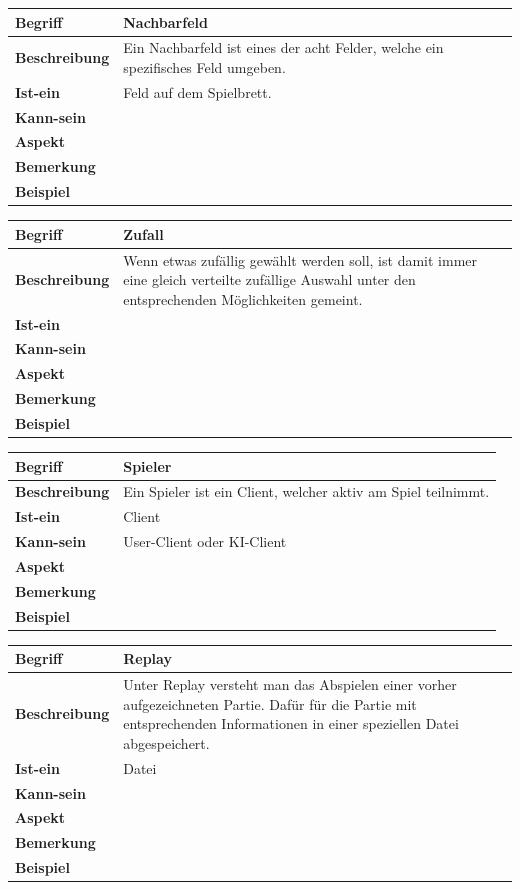 \documentclass[12pt]{article}
\newcounter{fa}
\begin{document}
\begin{tabularx}{\linewidth}{|l|X|}
\hline
\textbf{Begriff} & \textbf{Nachbarfeld } \\
\hline
\textbf{Beschreibung} & Ein Nachbarfeld ist eines der acht Felder, welche ein spezifisches Feld umgeben. \\
\hline
\textbf{Ist-ein} & Feld auf dem Spielbrett. \\
\hline
\textbf{Kann-sein} & \\
\hline
\textbf{Aspekt} &  \\
\hline
\textbf{Bemerkung} & \\
\hline
\textbf{Beispiel} & \\
\hline
\end{tabularx}

\begin{tabularx}{\linewidth}{|l|X|}
\hline
\textbf{Begriff} & \textbf{Zufall  } \\
\hline
\textbf{Beschreibung} & Wenn etwas zufällig gewählt werden soll, ist damit immer eine gleich verteilte zufällige Auswahl unter den
entsprechenden Möglichkeiten gemeint. \\
\hline
\textbf{Ist-ein} & \\
\hline
\textbf{Kann-sein} & \\
\hline
\textbf{Aspekt} &  \\
\hline
\textbf{Bemerkung} & \\
\hline
\textbf{Beispiel} & \\
\hline
\end{tabularx}

\begin{tabularx}{\linewidth}{|l|X|}
\hline
\textbf{Begriff} & \textbf{Spieler} \\
\hline
\textbf{Beschreibung} & Ein Spieler ist ein Client, welcher aktiv am Spiel teilnimmt.  \\
\hline
\textbf{Ist-ein} & Client\\
\hline
\textbf{Kann-sein} & User-Client oder KI-Client\\
\hline
\textbf{Aspekt} &  \\
\hline
\textbf{Bemerkung} & \\
\hline
\textbf{Beispiel} & \\
\hline
\end{tabularx}

\begin{tabularx}{\linewidth}{|l|X|}
\hline
\textbf{Begriff} & \textbf{Replay} \\
\hline
\textbf{Beschreibung} & Unter Replay versteht man das Abspielen einer vorher aufgezeichneten Partie. Dafür für die Partie mit entsprechenden Informationen in einer speziellen Datei abgespeichert. \\
\hline
\textbf{Ist-ein} & Datei \\
\hline
\textbf{Kann-sein} & \\
\hline
\textbf{Aspekt} & \\
\hline
\textbf{Bemerkung} & \\
\hline
\textbf{Beispiel} & \\
\hline
\end{tabularx}
\end{document}
